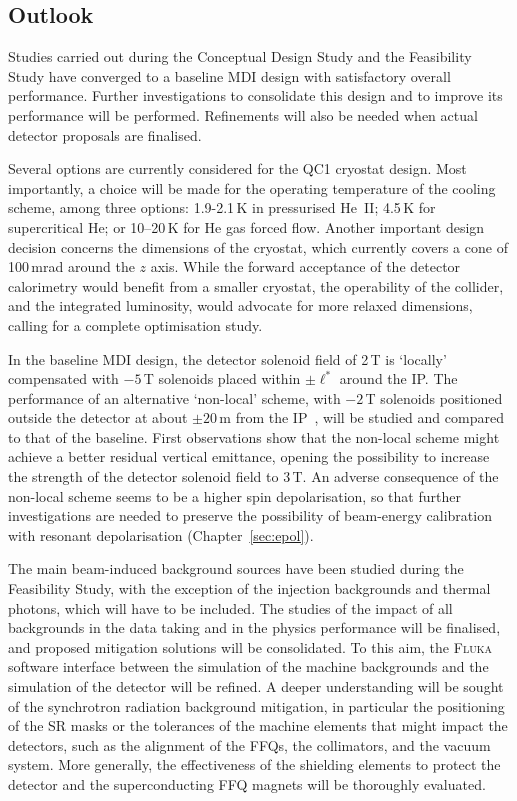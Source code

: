 \subsection{Outlook}

Studies carried out during the Conceptual Design Study and the Feasibility Study have converged to a baseline MDI design with satisfactory overall performance. 
Further investigations to consolidate this design and to improve its performance will be performed. 
Refinements will also be needed when actual detector proposals are finalised.   

Several options are currently considered for the QC1 cryostat design. 
Most importantly, a choice will be made for the operating temperature of the cooling scheme, 
among three options: 
1.9-2.1\,K in pressurised He~II; 
4.5\,K for supercritical He; 
or 10--20\,K for He gas forced flow. 
Another important design decision concerns the dimensions of the cryostat, 
which currently covers a cone of 100\,mrad around the $z$ axis. 
While the forward acceptance of the detector calorimetry would benefit from a smaller cryostat,
the operability of the collider, and the integrated luminosity, would advocate for more relaxed dimensions, 
calling for a complete optimisation study.  

In the baseline MDI design, 
the detector solenoid field of 2\,T is `locally' compensated with $-5$\,T solenoids placed within $\pm\ell^*$ around the IP. 
The performance of an alternative `non-local' scheme, 
with $-2$\,T solenoids positioned outside the detector at about $\pm 20$\,m from the IP~\cite{Ciarma:2024mri}, 
will be studied and compared to that of the baseline. 
First observations show that the non-local scheme might achieve a better residual vertical emittance, 
opening the possibility to increase the strength of the detector solenoid field to 3\,T. 
An adverse consequence of the non-local scheme seems to be a higher spin depolarisation, 
so that further investigations are needed to preserve the possibility of beam-energy calibration with resonant depolarisation (Chapter~\ref{sec:epol}). 

The main beam-induced background sources have been studied during the Feasibility Study, 
with the exception of the injection backgrounds and thermal photons, which will have to be included. 
The studies of the impact of all backgrounds in the data taking and in the physics performance will be finalised, 
and proposed mitigation solutions will be consolidated. 
To this aim, the \textsc{Fluka} software interface between the simulation of the machine backgrounds and the simulation of the detector will be refined. 
A deeper understanding will be sought of the synchrotron radiation background mitigation, 
in particular the positioning of the SR masks or the tolerances of the machine elements that might impact the detectors, 
such as the alignment of the FFQs, the collimators, and the vacuum system.  
More generally, the effectiveness of the shielding elements to protect the detector and the superconducting FFQ magnets will be thoroughly evaluated.

